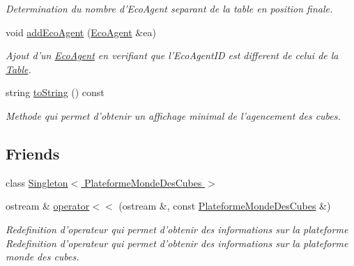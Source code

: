 \begin{CompactItemize}
\begin{CompactList}\small\item\em Determination du nombre d'EcoAgent separant de la table en position finale. \item\end{CompactList}\item 
void \hyperlink{classPlateformeMondeDesCubes_6fb5b9ececb0e7893b2c7ff5531cb3b1}{addEcoAgent} (\hyperlink{classEcoAgent}{EcoAgent} \&ea)
\begin{CompactList}\small\item\em Ajout d'un \hyperlink{classEcoAgent}{EcoAgent} en verifiant que l'EcoAgentID est different de celui de la \hyperlink{classTable}{Table}. \item\end{CompactList}\item 
string \hyperlink{classPlateformeMondeDesCubes_a834747e527529fd8c4bfc61bee6c20f}{toString} () const 
\begin{CompactList}\small\item\em Methode qui permet d'obtenir un affichage minimal de l'agencement des cubes. \item\end{CompactList}\end{CompactItemize}
\subsection*{Friends}
\begin{CompactItemize}
\item 
\hypertarget{classPlateformeMondeDesCubes_95609583990e9782a41cc432bdd2578d}{
class \hyperlink{classPlateformeMondeDesCubes_95609583990e9782a41cc432bdd2578d}{Singleton$<$ PlateformeMondeDesCubes $>$}}
\label{classPlateformeMondeDesCubes_95609583990e9782a41cc432bdd2578d}

\item 
ostream \& \hyperlink{classPlateformeMondeDesCubes_98d6997efa9a51e23997364f1f09c7bd}{operator$<$$<$} (ostream \&, const \hyperlink{classPlateformeMondeDesCubes}{PlateformeMondeDesCubes} \&)
\begin{CompactList}\small\item\em Redefinition d'operateur qui permet d'obtenir des informations sur la plateforme Redefinition d'operateur qui permet d'obtenir des informations sur la plateforme monde des cubes. \item\end{CompactList}\end{CompactItemize}


